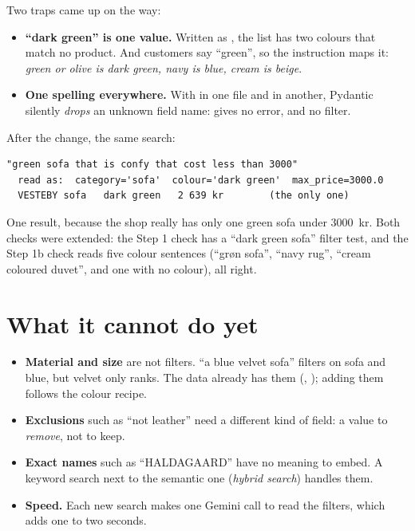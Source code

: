 \documentclass[11pt]{article}
\begin{document}
Two traps came up on the way:
\begin{itemize}[leftmargin=1.4em, itemsep=2pt]
\item \textbf{``dark green'' is one value.} Written as
  , the list has two colours that match no
  product. And customers say ``green'', so the instruction maps it:
  \emph{green or olive is dark green, navy is blue, cream is beige}.
\item \textbf{One spelling everywhere.} With  in one file
  and  in another, Pydantic silently \emph{drops} an
  unknown field name:  gives no error,
  and no filter.
\end{itemize}

After the change, the same search:
\begin{lstlisting}
"green sofa that is confy that cost less than 3000"
  read as:  category='sofa'  colour='dark green'  max_price=3000.0
  VESTEBY sofa   dark green   2 639 kr        (the only one)
\end{lstlisting}
One result, because the shop really has only one green sofa under
3000~kr. Both checks were extended: the Step 1 check has a ``dark green
sofa'' filter test, and the Step 1b check reads five colour sentences
(``grøn sofa'', ``navy rug'', ``cream coloured duvet'', and one with no
colour), all right.

\section{What it cannot do yet}

\begin{itemize}[leftmargin=1.4em, itemsep=3pt]
\item \textbf{Material and size} are not filters. ``a blue velvet sofa''
  filters on sofa and blue, but velvet only ranks. The data already
  has them (, ); adding
  them follows the colour recipe.
\item \textbf{Exclusions} such as ``not leather'' need a different kind
  of field: a value to \emph{remove}, not to keep.
\item \textbf{Exact names} such as ``HALDAGAARD'' have no meaning to
  embed. A keyword search next to the semantic one (\emph{hybrid
  search}) handles them.
\item \textbf{Speed.} Each new search makes one Gemini call to read the
  filters, which adds one to two seconds.
\end{itemize}
\end{document}
